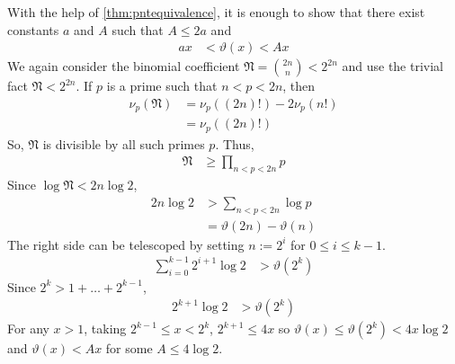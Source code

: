 \documentclass[elemannt.tex]{subfile}
\begin{document}
			With the help of \autoref{thm:pntequivalence}, it is enough to show that there exist constants $a$ and $A$ such that $A\leq 2a$ and
				\begin{align*}
					ax
					& < \vartheta(x) < Ax
				\end{align*}
			We again consider the binomial coefficient $\mathfrak{N}=\binom{2n}{n}<2^{2n}$ and use the trivial fact $\mathfrak{N}<2^{2n}$. If $p$ is a prime such that $n<p<2n$, then
				\begin{align*}
					\nu_{p}(\mathfrak{N})
						& = \nu_{p}((2n)!)-2\nu_{p}(n!)\\
						& = \nu_{p}((2n)!)
				\end{align*}
			So, $\mathfrak{N}$ is divisible by all such primes $p$. Thus,
				\begin{align*}
					\mathfrak{N}
						& \geq \prod_{n<p<2n}p
				\end{align*}
			Since $\log{\mathfrak{N}}<2n\log{2}$,
				\begin{align*}
					2n\log{2}
						& > \sum_{n<p<2n}\log{p}\\
						& = \vartheta(2n)-\vartheta(n)
				\end{align*}
			The right side can be telescoped by setting $n:=2^{i}$ for $0\leq i\leq  k-1$.
				\begin{align*}
					\sum_{i=0}^{k-1}2^{i+1}\log{2}
						& > \vartheta(2^{k})
				\end{align*}
			Since $2^{k}>1+\ldots+2^{k-1}$,
				\begin{align*}
					2^{k+1}\log{2}
						& > \vartheta(2^{k})
				\end{align*}
			For any $x>1$, taking $2^{k-1}\leq x<2^{k}$, $2^{k+1}\leq 4x$ so $\vartheta(x)\leq\vartheta(2^{k})<4x\log{2}$ and $\vartheta(x)<Ax$ for some $A\leq 4\log{2}$.
\end{document}
